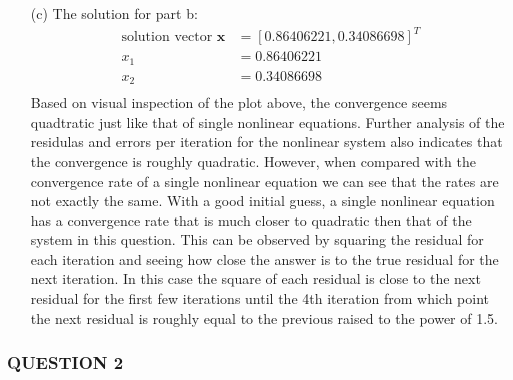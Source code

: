 \documentclass{article}
\begin{document}
\begin{enumerate}
    \item[(c)]  The solution for part b:
                \begin{align*}
                    \text{solution vector } \mathbf{x} &= [0.86406221, 0.34086698]^{T}\\
                                                 x_{1} &= 0.86406221\\
                                                 x_{2} &= 0.34086698\\
                \end{align*}
                Based on visual inspection of the plot above, the convergence seems quadtratic just like that of single nonlinear equations.
                Further analysis of the residulas and errors per iteration for the nonlinear system also indicates that the convergence is
                roughly quadratic. However, when compared with the convergence rate of a single nonlinear equation we can see that the rates
                are not exactly the same. With a good initial guess, a single nonlinear equation has a convergence rate that is much closer
                to quadratic then that of the system in this question. This can be observed by squaring the residual for each iteration
                and seeing how close the answer is to the true residual for the next iteration. In this case the square of each residual is
                close to the next residual for the first few iterations until the 4th iteration from which point the next residual is roughly
                equal to the previous raised to the power of 1.5. 


\end{enumerate}
\newpage

\subsubsection*{QUESTION 2}

\vspace{10pt}
\end{document}
